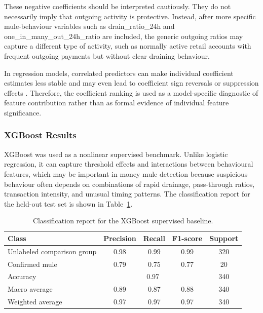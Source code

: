 These negative coefficients should be interpreted cautiously. They do not necessarily imply that outgoing activity is protective. Instead, after more specific mule-behaviour variables such as drain\_ratio\_24h and one\_in\_many\_out\_24h\_ratio are included, the generic outgoing ratios may capture a different type of activity, such as normally active retail accounts with frequent outgoing payments but without clear draining behaviour.

In regression models, correlated predictors can make individual coefficient estimates less stable and may even lead to coefficient sign reversals or suppression effects 
\citep{vatcheva2016multicollinearity,ludlow2014suppressor}. Therefore, the coefficient 
ranking is used as a model-specific diagnostic of feature contribution rather than as formal 
evidence of individual feature significance.
\subsubsection{XGBoost Results}

XGBoost was used as a nonlinear supervised benchmark. Unlike logistic regression, it can capture threshold effects and interactions between behavioural features, which may be important in money mule detection because suspicious behaviour often depends on combinations of rapid drainage, pass-through ratios, transaction intensity, and unusual timing patterns. The classification report for the held-out test set is shown in Table~\ref{tab:xgboost_classification_report}.

\begin{table}[H]
\centering
\begin{tabular}{lcccc}
\hline
Class & Precision & Recall & F1-score & Support \\
\hline
Unlabeled comparison group & 0.98 & 0.99 & 0.99 & 320 \\
Confirmed mule & 0.79 & 0.75 & 0.77 & 20 \\
\hline
Accuracy & \multicolumn{3}{c}{0.97} & 340 \\
Macro average & 0.89 & 0.87 & 0.88 & 340 \\
Weighted average & 0.97 & 0.97 & 0.97 & 340 \\
\hline
\end{tabular}
\caption{Classification report for the XGBoost supervised baseline.}
\label{tab:xgboost_classification_report}
\end{table}

